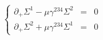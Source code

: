 \begin{equation}
\left\{
\begin{array}{rcl}
 \partial_+ \Sigma^1 -  \mu \gamma^{234} \Sigma^2 &=& 0 \\
 \partial_+ \Sigma^2 +  \mu \gamma^{234} \Sigma^1 &=& 0 
\end{array}
\right.
\end{equation} 
